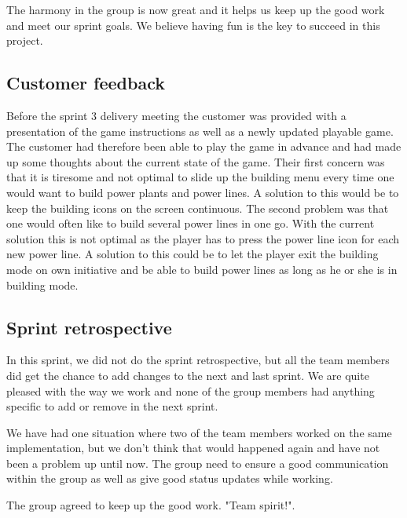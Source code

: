 	The harmony in the group is now great and it helps us keep up the good work and meet 
	our sprint goals. We believe having fun is the key to succeed in this project. 

\subsection{Customer feedback}

	Before the sprint 3 delivery meeting the customer was provided with a presentation 
	of the game instructions as well as a newly updated playable game. The customer had 
	therefore been able to play the game in advance and had made up some thoughts about 
	the current state of the game. Their first concern was that it is tiresome and not 
	optimal to slide up the building menu every time one would want to build power plants 
	and power lines. A solution to this would be to keep the building icons on the screen 
	continuous. The second problem was that one would often like to build several power 
	lines in one go. With the current solution this is not optimal as the player has to 
	press the power line icon for each new power line. A solution to this could be to let 
	the player exit the building mode on own initiative and be able to build power lines as 
	long as he or she is in building mode.

\subsection{Sprint retrospective}
	In this sprint, we did not do the sprint retrospective, but all the team members did
	get the chance to add changes to the next and last sprint. We are quite pleased with the way 
	we work and none of the group members had anything specific to add or remove in the next sprint.

	We have had one situation where two of the team members worked on the same implementation, 
	but we don't think that would happened again and have not been a problem up until now. 
	The group need to ensure a good communication within the group as well as give good status
	updates while working. 

	The group agreed to keep up the good work. "Team spirit!".
